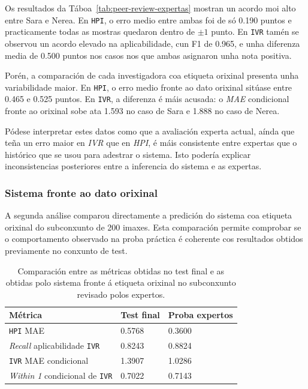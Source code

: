 Os resultados da Táboa~\ref{tab:peer-review-expertas} mostran un acordo moi alto entre Sara e
Nerea. En \texttt{HPI}, o erro medio entre ambas foi de só 0.190 puntos e practicamente todas as
mostras quedaron dentro de $\pm 1$ punto. En \texttt{IVR} tamén se observou un acordo elevado na
aplicabilidade, cun F1 de 0.965, e unha diferenza media de 0.500 puntos nos casos nos que ambas
asignaron unha nota positiva.

Porén, a comparación de cada investigadora coa etiqueta orixinal presenta unha variabilidade maior.
En \texttt{HPI}, o erro medio fronte ao dato orixinal sitúase entre 0.465 e 0.525 puntos. En
\texttt{IVR}, a diferenza é máis acusada: o \textit{MAE} condicional fronte ao orixinal sobe ata
1.593 no caso de Sara e 1.888 no caso de Nerea. 

Pódese interpretar estes datos como que a avaliación experta actual, aínda que teña un erro maior en \textit{IVR} que 
en \textit{HPI}, é máis consistente entre expertas que o histórico que se usou para adestrar o sistema. Isto podería
explicar inconsistencias posteriores entre a inferencia do sistema e as expertas.

\subsubsection{Sistema fronte ao dato orixinal}
A segunda análise comparou directamente a predición do sistema coa etiqueta orixinal do subconxunto
de 200 imaxes. Esta comparación permite comprobar se o comportamento observado na proba práctica é
coherente cos resultados obtidos previamente no conxunto de test.

{
\begin{table}[htbp]
    \centering
    \scriptsize
    \setlength{\tabcolsep}{4pt}
    \begin{tabular}{p{}|p{}|p{}}
        \rowcolor{udcpink!25}
        \textbf{Métrica} & \textbf{Test final} & \textbf{Proba expertos} \\\hline
        \texttt{HPI} MAE & 0.5768 & 0.3600 \\
        \textit{Recall} aplicabilidade \texttt{IVR} & 0.8243 & 0.8824 \\
        \texttt{IVR} MAE condicional & 1.3907 & 1.0286 \\
        \textit{Within 1} condicional de \texttt{IVR} & 0.7022 & 0.7143 \\
    \end{tabular}
    \caption{Comparación entre as métricas obtidas no test final e as obtidas polo sistema fronte á etiqueta orixinal no subconxunto revisado polos expertos.}
    \label{tab:peer-review-sistema-orixinal}
\end{table}
}

